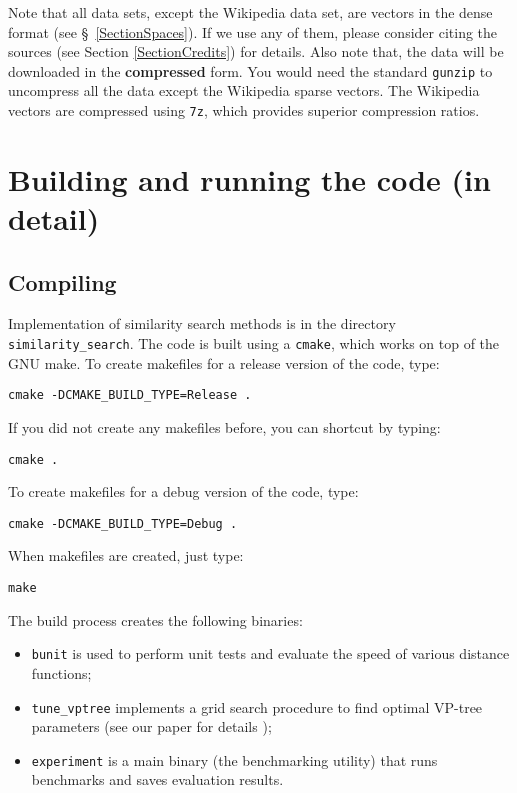 \documentclass[runningheads,a4paper]{llncs}
\newcommand{\ttt}[1]{\texttt{#1}}
\begin{document}
{Note that all data sets, except the Wikipedia data set, are vectors in the 
dense format (see \S~\ref{SectionSpaces}).
If we use any of them, please consider citing the sources (see Section \ref{SectionCredits}) for details.
Also note that, the data will be downloaded in the \textbf{compressed} form.
You would need the standard \ttt{gunzip} to uncompress all the data except
the Wikipedia sparse vectors.
The Wikipedia vectors are compressed using \ttt{7z}, which provides 
superior compression ratios.

\section{Building and running the code (in detail)}\label{SectionBuild}
\subsection{Compiling}
Implementation of similarity search methods is in the directory \ttt{similarity\_search}.
The code is built using a \ttt{cmake}, which works on top of the GNU make.
To create makefiles for a release version of the code, type:
\begin{verbatim}
cmake -DCMAKE_BUILD_TYPE=Release .
\end{verbatim}
If you did not create any makefiles before, you can shortcut by typing:
\begin{verbatim}
cmake . 
\end{verbatim}
To create makefiles for a debug version of the code, type:
\begin{verbatim}
cmake -DCMAKE_BUILD_TYPE=Debug .
\end{verbatim}
When makefiles are created, just type:
\begin{verbatim}
make
\end{verbatim}

The build process creates the following binaries:
\begin{itemize}
\item \ttt{bunit} is used to perform unit tests and 
evaluate the speed of various distance functions;
\item \ttt{tune\_vptree} implements a grid search procedure to find optimal VP-tree parameters (see our paper for details \cite{Boytsov_and_Bilegsaikhan:nips2013});
\item \ttt{experiment} is a main binary (the benchmarking utility) that runs benchmarks and saves evaluation results.
\end{itemize}

}
\end{document}
